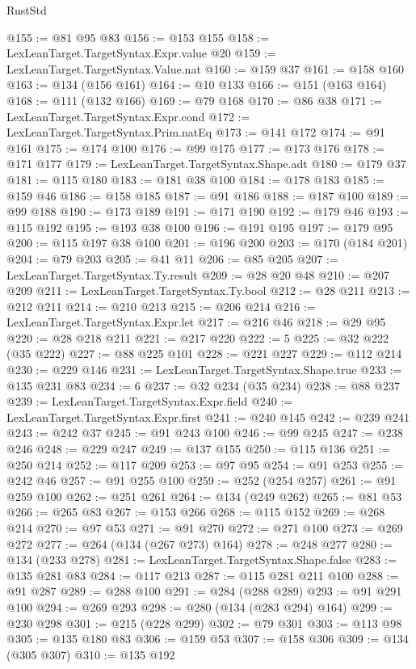 \begin{lexlean}{RustStd}
\begin{coremodule}
@155 := @81 @95 @83
@156 := @153 @155
@158 := LexLeanTarget.TargetSyntax.Expr.value @20
@159 := LexLeanTarget.TargetSyntax.Value.nat
@160 := @159 @37
@161 := @158 @160
@163 := @134 (@156 @161)
@164 := @10 @133
@166 := @151 (@163 @164)
@168 := @111 (@132 @166)
@169 := @79 @168
@170 := @86 @38
@171 := LexLeanTarget.TargetSyntax.Expr.cond
@172 := LexLeanTarget.TargetSyntax.Prim.natEq
@173 := @141 @172
@174 := @91 @161
@175 := @174 @100
@176 := @99 @175
@177 := @173 @176
@178 := @171 @177
@179 := LexLeanTarget.TargetSyntax.Shape.adt
@180 := @179 @37
@181 := @115 @180
@183 := @181 @38 @100
@184 := @178 @183
@185 := @159 @46
@186 := @158 @185
@187 := @91 @186
@188 := @187 @100
@189 := @99 @188
@190 := @173 @189
@191 := @171 @190
@192 := @179 @46
@193 := @115 @192
@195 := @193 @38 @100
@196 := @191 @195
@197 := @179 @95
@200 := @115 @197 @38 @100
@201 := @196 @200
@203 := @170 (@184 @201)
@204 := @79 @203
@205 := @41 @11
@206 := @85 @205
@207 := LexLeanTarget.TargetSyntax.Ty.result
@209 := @28 @20 @48
@210 := @207 @209
@211 := LexLeanTarget.TargetSyntax.Ty.bool
@212 := @28 @211
@213 := @212 @211
@214 := @210 @213
@215 := @206 @214
@216 := LexLeanTarget.TargetSyntax.Expr.let
@217 := @216 @46
@218 := @29 @95
@220 := @28 @218 @211
@221 := @217 @220
@222 := 5
@225 := @32 @222 (@35 @222)
@227 := @88 @225 @101
@228 := @221 @227
@229 := @112 @214
@230 := @229 @146
@231 := LexLeanTarget.TargetSyntax.Shape.true
@233 := @135 @231 @83
@234 := 6
@237 := @32 @234 (@35 @234)
@238 := @88 @237
@239 := LexLeanTarget.TargetSyntax.Expr.field
@240 := LexLeanTarget.TargetSyntax.Expr.first
@241 := @240 @145
@242 := @239 @241
@243 := @242 @37
@245 := @91 @243 @100
@246 := @99 @245
@247 := @238 @246
@248 := @229 @247
@249 := @137 @155
@250 := @115 @136
@251 := @250 @214
@252 := @117 @209
@253 := @97 @95
@254 := @91 @253
@255 := @242 @46
@257 := @91 @255 @100
@259 := @252 (@254 @257)
@261 := @91 @259 @100
@262 := @251 @261
@264 := @134 (@249 @262)
@265 := @81 @53
@266 := @265 @83
@267 := @153 @266
@268 := @115 @152
@269 := @268 @214
@270 := @97 @53
@271 := @91 @270
@272 := @271 @100
@273 := @269 @272
@277 := @264 (@134 (@267 @273) @164)
@278 := @248 @277
@280 := @134 (@233 @278)
@281 := LexLeanTarget.TargetSyntax.Shape.false
@283 := @135 @281 @83
@284 := @117 @213
@287 := @115 @281 @211 @100
@288 := @91 @287
@289 := @288 @100
@291 := @284 (@288 @289)
@293 := @91 @291 @100
@294 := @269 @293
@298 := @280 (@134 (@283 @294) @164)
@299 := @230 @298
@301 := @215 (@228 @299)
@302 := @79 @301
@303 := @113 @98
@305 := @135 @180 @83
@306 := @159 @53
@307 := @158 @306
@309 := @134 (@305 @307)
@310 := @135 @192

\end{coremodule}
\end{lexlean}
